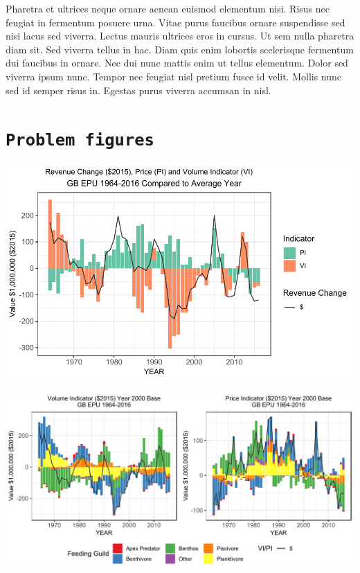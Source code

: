 \documentclass[11pt,]{article}
\begin{document}
Pharetra et ultrices neque ornare aenean euismod elementum nisi. Risus
nec feugiat in fermentum posuere urna. Vitae purus faucibus ornare
suspendisse sed nisi lacus sed viverra. Lectus mauris ultrices eros in
cursus. Ut sem nulla pharetra diam sit. Sed viverra tellus in hac. Diam
quis enim lobortis scelerisque fermentum dui faucibus in ornare. Nec dui
nunc mattis enim ut tellus elementum. Dolor sed viverra ipsum nunc.
Tempor nec feugiat nisl pretium fusce id velit. Mollis nunc sed id
semper risus in. Egestas purus viverra accumsan in nisl.

\hypertarget{problem-figures}{%
\section{\texorpdfstring{\texttt{Problem\ figures}}{Problem figures}}\label{problem-figures}}

\begin{center}\includegraphics{font_test_files/figure-latex/Bennet-indicator-1} \end{center}

\includegraphics{font_test_files/figure-latex/plot2-1.pdf}
\end{document}
